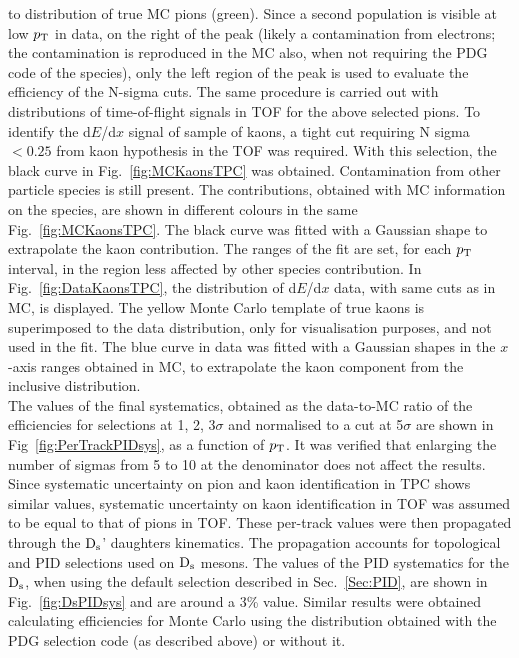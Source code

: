 to distribution of true MC pions (green). 
Since a second population is visible at low $p_{\rm T}$ in data, on the right of the 
peak (likely a contamination from electrons; the contamination is reproduced in the MC
also, when not requiring the PDG code of the species), 
only the left region of the peak is used 
to evaluate the efficiency of the N-sigma cuts. The same procedure
is carried out with distributions of time-of-flight signals in TOF
for the above selected pions.
To identify the d$E$/d$x$ signal of sample of kaons, a tight cut requiring N 
sigma $< 0.25$ from kaon hypothesis in the TOF was required. 
With this selection, the black curve in Fig.~\ref{fig:MCKaonsTPC} was obtained.
Contamination from other particle species is still present. The
contributions, obtained with MC information on the species, are shown in different colours in the same Fig.~\ref{fig:MCKaonsTPC}. The black curve was fitted with a Gaussian shape 
to extrapolate the kaon contribution. The ranges of the fit are set, for each $p_{\rm T}$ interval, in 
the region less affected by other species contribution.
In Fig.~\ref{fig:DataKaonsTPC}, the distribution of d$E$/d$x$ data, with 
same cuts as in MC, is displayed. The yellow Monte Carlo template of true 
kaons is superimposed to the data distribution, 
only for visualisation purposes, and not used in the fit. The blue curve in data
was fitted with a Gaussian shapes in the $x$-axis ranges obtained in MC,
to extrapolate the kaon component from the inclusive distribution.\\
The values of the final systematics, obtained as the data-to-MC ratio
of the efficiencies for selections at 1, 2, 3$\sigma$ and normalised to a cut at 5$\sigma$
are shown in Fig~\ref{fig:PerTrackPIDsys}, as a function of $p_{\rm T}$. 
It was verified that enlarging the number of sigmas from 5 to 10 at the 
denominator does not affect the results.
Since systematic uncertainty on pion and kaon identification in 
TPC shows similar values, systematic uncertainty on kaon identification in TOF 
was assumed to be equal to that of pions in TOF. 
These per-track values were then propagated 
through the ${\rm D_s}$' daughters kinematics. The propagation accounts for topological and
PID selections used on ${\rm D_s}$ mesons. The values of the PID 
systematics for the ${\rm D_s}$, when using the default selection described in Sec.~\ref{Sec:PID}, 
are shown in Fig.~\ref{fig:DsPIDsys} and are around a 3\% value. Similar results were 
obtained calculating efficiencies for Monte Carlo using the distribution obtained with
 the PDG selection code (as described above) or without it.


